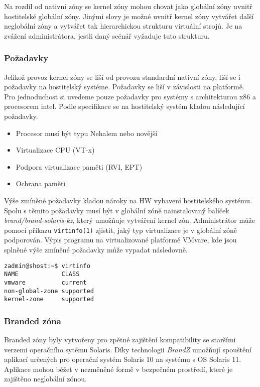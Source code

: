 Na rozdíl od nativní zóny se kernel zóny mohou chovat jako globální zóny uvnitř hostitelské globální zóny. Jinými slovy je
možné uvnitř kernel zóny vytvářet další neglobální zóny a vytvářet tak hierarchickou strukturu virtuální strojů. Je na zvážení
administrátora, jestli daný scénář vyžaduje tuto strukturu.
\subsubsection*{Požadavky}
Jelikož provoz kernel zóny se liší od provozu standardní nativní zóny, liší se i požadavky na hostitelský systéme. Požadavky
se liší v závislosti na platformě. Pro jednoduchost si uvedeme pouze požadavky pro systémy s architekturou x86 a procesorem 
intel. Podle specifikace \cite{oracle:solaris:zones:kernel_zones_requiremets} se na hostitelský systém kladou následující
požadavky.

\begin{itemize}
 \item Procesor musí být typu Nehalem nebo novější
 \item Virtualizace CPU (VT-x) 
 \item Podpora virtualizace paměti (RVI, EPT)
 \item Ochrana paměti
\end{itemize}

Výše zmíněné požadavky kladou nároky na HW vybavení hostitelského systému. Spolu s těmito požadavky musí být v globální zóně
nainstalovaný balíček \textit{brand/brand-solaris-kz}, který umožňuje vytváření kernel zón. Administrátor může pomocí příkazu
\verb|virtinfo(1)| zjistit, jaký typ virtualizace je v globální zóně podporován. Výpis programu na virtualizované platformě
VMvare, kde jsou splněné výše zmíněné požadavky může vypadat následovně.

\begin{verbatim}
zadmin@shost:~$ virtinfo
NAME            CLASS     
vmware          current   
non-global-zone supported
kernel-zone     supported
\end{verbatim}


\subsubsection{Branded zóna}
\label{chapter:zones:branded}
Branded zóny byly vytvořeny pro zpětné zajištění kompatibility se staršími verzemi operačního sytému Solaris. Díky technologii
\textit{BrandZ} \cite{oracle:solaris:zones:brands} umožňují spouštění aplikací určených pro operační systém Solaris 10 na 
systému s OS Solaris 11. Aplikace mohou běžet v nezměněné formě v bezpečném prostředí, které je zajištěno neglobální zónou.

